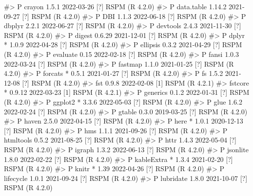 \documentclass[
  11pt,
  letterpaper,
  DIV=11,
  numbers=noendperiod]{scrartcl}
\newenvironment{Shaded}{}{}
\newcommand{\CommentTok}[1]{\textcolor[rgb]{0.42,0.45,0.49}{#1}}
\begin{document}
\begin{Shaded}
\begin{Highlighting}[]
\CommentTok{\#\textgreater{}  P crayon        1.5.1   2022{-}03{-}26 [?] RSPM (R 4.2.0)}
\CommentTok{\#\textgreater{}  P data.table    1.14.2  2021{-}09{-}27 [?] RSPM (R 4.2.0)}
\CommentTok{\#\textgreater{}  P DBI           1.1.3   2022{-}06{-}18 [?] RSPM (R 4.2.0)}
\CommentTok{\#\textgreater{}  P dbplyr        2.2.1   2022{-}06{-}27 [?] RSPM (R 4.2.0)}
\CommentTok{\#\textgreater{}  P devtools      2.4.3   2021{-}11{-}30 [?] RSPM (R 4.2.0)}
\CommentTok{\#\textgreater{}  P digest        0.6.29  2021{-}12{-}01 [?] RSPM (R 4.2.0)}
\CommentTok{\#\textgreater{}  P dplyr       * 1.0.9   2022{-}04{-}28 [?] RSPM (R 4.2.0)}
\CommentTok{\#\textgreater{}  P ellipsis      0.3.2   2021{-}04{-}29 [?] RSPM (R 4.2.0)}
\CommentTok{\#\textgreater{}  P evaluate      0.15    2022{-}02{-}18 [?] RSPM (R 4.2.0)}
\CommentTok{\#\textgreater{}  P fansi         1.0.3   2022{-}03{-}24 [?] RSPM (R 4.2.0)}
\CommentTok{\#\textgreater{}  P fastmap       1.1.0   2021{-}01{-}25 [?] RSPM (R 4.2.0)}
\CommentTok{\#\textgreater{}  P forcats     * 0.5.1   2021{-}01{-}27 [?] RSPM (R 4.2.0)}
\CommentTok{\#\textgreater{}  P fs            1.5.2   2021{-}12{-}08 [?] RSPM (R 4.2.0)}
\CommentTok{\#\textgreater{}    fst           0.9.8   2022{-}02{-}08 [1] RSPM (R 4.2.1)}
\CommentTok{\#\textgreater{}    fstcore     * 0.9.12  2022{-}03{-}23 [1] RSPM (R 4.2.1)}
\CommentTok{\#\textgreater{}  P generics      0.1.2   2022{-}01{-}31 [?] RSPM (R 4.2.0)}
\CommentTok{\#\textgreater{}  P ggplot2     * 3.3.6   2022{-}05{-}03 [?] RSPM (R 4.2.0)}
\CommentTok{\#\textgreater{}  P glue          1.6.2   2022{-}02{-}24 [?] RSPM (R 4.2.0)}
\CommentTok{\#\textgreater{}  P gtable        0.3.0   2019{-}03{-}25 [?] RSPM (R 4.2.0)}
\CommentTok{\#\textgreater{}  P haven         2.5.0   2022{-}04{-}15 [?] RSPM (R 4.2.0)}
\CommentTok{\#\textgreater{}  P here        * 1.0.1   2020{-}12{-}13 [?] RSPM (R 4.2.0)}
\CommentTok{\#\textgreater{}  P hms           1.1.1   2021{-}09{-}26 [?] RSPM (R 4.2.0)}
\CommentTok{\#\textgreater{}  P htmltools     0.5.2   2021{-}08{-}25 [?] RSPM (R 4.2.0)}
\CommentTok{\#\textgreater{}  P httr          1.4.3   2022{-}05{-}04 [?] RSPM (R 4.2.0)}
\CommentTok{\#\textgreater{}  P igraph        1.3.2   2022{-}06{-}13 [?] RSPM (R 4.2.0)}
\CommentTok{\#\textgreater{}  P jsonlite      1.8.0   2022{-}02{-}22 [?] RSPM (R 4.2.0)}
\CommentTok{\#\textgreater{}  P kableExtra  * 1.3.4   2021{-}02{-}20 [?] RSPM (R 4.2.0)}
\CommentTok{\#\textgreater{}  P knitr       * 1.39    2022{-}04{-}26 [?] RSPM (R 4.2.0)}
\CommentTok{\#\textgreater{}  P lifecycle     1.0.1   2021{-}09{-}24 [?] RSPM (R 4.2.0)}
\CommentTok{\#\textgreater{}  P lubridate     1.8.0   2021{-}10{-}07 [?] RSPM (R 4.2.0)}

\end{Highlighting}
\end{Shaded}
\end{document}

